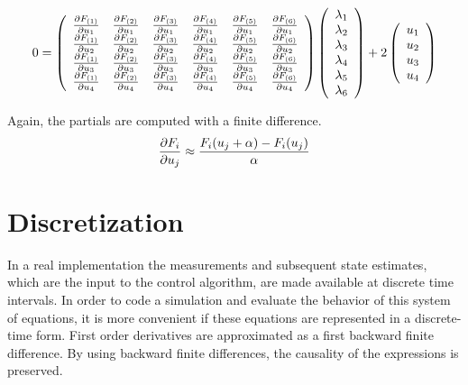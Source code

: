 \begin{equation}
    0  = \left(
    \begin{array}{c c c c c c}
    \frac{\partial F_{(1)}}{\partial u_1} & \frac{\partial F_{(2)}}{\partial u_1} & \frac{\partial F_{(3)}}{\partial u_1} & \frac{\partial F_{(4)}}{\partial u_1} & \frac{\partial F_{(5)}}{\partial u_1} & \frac{\partial F_{(6)}}{\partial u_1} \\
    \frac{\partial F_{(1)}}{\partial u_2} & \frac{\partial F_{(2)}}{\partial u_2} & \frac{\partial F_{(3)}}{\partial u_2} & \frac{\partial F_{(4)}}{\partial u_2} & \frac{\partial F_{(5)}}{\partial u_2} & \frac{\partial F_{(6)}}{\partial u_2} \\
    \frac{\partial F_{(1)}}{\partial u_3} & \frac{\partial F_{(2)}}{\partial u_3} & \frac{\partial F_{(3)}}{\partial u_3} & \frac{\partial F_{(4)}}{\partial u_3} & \frac{\partial F_{(5)}}{\partial u_3} & \frac{\partial F_{(6)}}{\partial u_3} \\
    \frac{\partial F_{(1)}}{\partial u_4} & \frac{\partial F_{(2)}}{\partial u_4} & \frac{\partial F_{(3)}}{\partial u_4} & \frac{\partial F_{(4)}}{\partial u_4} & \frac{\partial F_{(5)}}{\partial u_4} & \frac{\partial F_{(6)}}{\partial u_4} \\
    \end{array}\right)
    \left(
    \begin{array}{c}
    \lambda_1\\
    \lambda_2\\
    \lambda_3\\
    \lambda_4\\
    \lambda_5\\
    \lambda_6\\
    \end{array}\right) + 2
    \left(\begin{array}{c} u_1 \\ u_2 \\ u_3 \\ u_4\end{array}\right)
\end{equation}

Again, the partials are computed with a finite difference.
\begin{equation}
    \frac{\partial F_i}{\partial u_j} \approx \frac{ F_i( u_j + \alpha) - F_i( u_j)  }{\alpha}
\end{equation}



\section{Discretization}

In a real implementation the measurements and subsequent state estimates, which are the input to the control algorithm, are made available at discrete time intervals. In order to code a simulation and evaluate the behavior of this system of equations, it is more convenient if these equations are represented in a discrete-time form. First order derivatives are approximated as a first backward finite difference. By using backward finite differences, the causality of the expressions is preserved.

